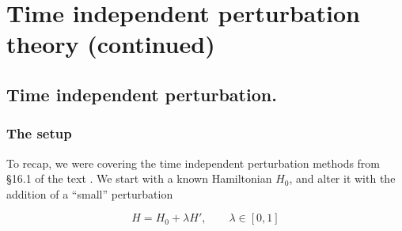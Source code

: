 %
%

\chapter{Time independent perturbation theory (continued)}
\label{chap:qmTwoL4}
{}
\date{Sept 21, 2011}

\beginArtWithToc

%

\section{Time independent perturbation.}
\subsection{The setup}

To recap, we were covering the time independent perturbation methods from \S 16.1 of the text \cite{desai2009quantum}.  We start with a known Hamiltonian $H_0$, and alter it with the addition of a ``small'' perturbation

\begin{equation}\label{eqn:qmTwoL4:10}
H = H_0 + \lambda H', \qquad \lambda \in [0,1]
\end{equation}

